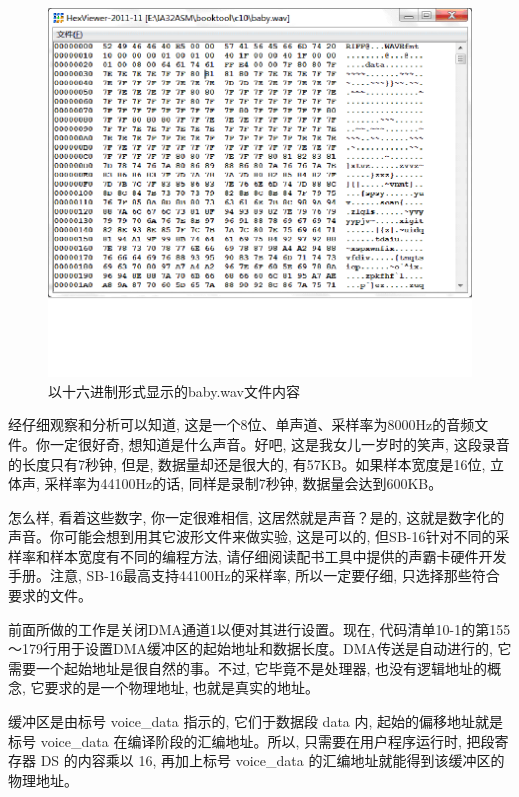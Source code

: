 \documentclass[12pt]{article}
\begin{document}
\begin{CJK}{UTF8}{gbsn}
\begin{figure}
\begin{center}
\includegraphics[width=\textwidth]{eps/10-8.bmp.eps}
\caption{以十六进制形式显示的baby.wav文件内容}\label{baby.wav}
\end{center}
\end{figure}

经仔细观察和分析可以知道, 这是一个8位、单声道、采样率为8000Hz的音频文件。你一定很好奇, 想知道是什么声音。好吧, 这是我女儿一岁时的笑声, 这段录音的长度只有7秒钟, 但是, 数据量却还是很大的, 有57KB。如果样本宽度是16位, 立体声, 采样率为44100Hz的话, 同样是录制7秒钟, 数据量会达到600KB。

怎么样, 看着这些数字, 你一定很难相信, 这居然就是声音？是的, 这就是数字化的声音。你可能会想到用其它波形文件来做实验, 这是可以的, 但SB-16针对不同的采样率和样本宽度有不同的编程方法, 请仔细阅读配书工具中提供的声霸卡硬件开发手册。注意, SB-16最高支持44100Hz的采样率, 所以一定要仔细, 只选择那些符合要求的文件。

前面所做的工作是关闭DMA通道1以便对其进行设置。现在, 代码清单10-1的第155～179行用于设置DMA缓冲区的起始地址和数据长度。DMA传送是自动进行的, 它需要一个起始地址是很自然的事。不过, 它毕竟不是处理器, 也没有逻辑地址的概念, 它要求的是一个物理地址, 也就是真实的地址。

缓冲区是由标号 voice\_{}data 指示的, 它们于数据段 data 内, 起始的偏移地址就是标号 voice\_{}data
在编译阶段的汇编地址。所以, 只需要在用户程序运行时, 把段寄存器 DS 的内容乘以 16, 再加上标号
voice\_{}data 的汇编地址就能得到该缓冲区的物理地址。


\end{CJK}
\end{document}
